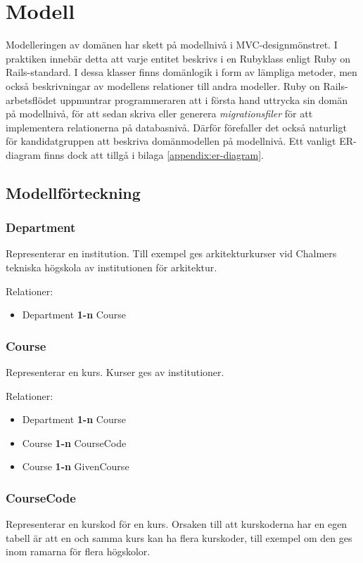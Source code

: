 \section{Modell}

Modelleringen av domänen har skett på modellnivå i MVC-designmönstret. 
I praktiken innebär detta att varje entitet beskrivs i en Rubyklass enligt Ruby on Rails-standard.
I dessa klasser finns domänlogik i form av lämpliga metoder, men också beskrivningar av 
modellens relationer till andra modeller.
Ruby on Rails-arbetsflödet uppmuntrar programmeraren att i första hand uttrycka sin domän på modellnivå,
för att sedan skriva eller generera \emph{migrationsfiler} för att implementera relationerna på databasnivå.
Därför förefaller det också naturligt för kandidatgruppen att beskriva domänmodellen på modellnivå.
Ett vanligt ER-diagram finns dock att tillgå i bilaga \ref{appendix:er-diagram}.

\subsection{Modellförteckning}
\subsubsection{Department}
Representerar en institution. Till exempel ges arkitekturkurser vid Chalmers tekniska högskola av institutionen för arkitektur.

Relationer:
\begin{itemize}
	\item Department {\bf 1-n} Course
\end{itemize}


\subsubsection{Course}
Representerar en kurs. Kurser ges av institutioner.

Relationer:
\begin{itemize}
	\item Department {\bf 1-n} Course
	\item Course {\bf 1-n} CourseCode
	\item Course {\bf 1-n} GivenCourse
\end{itemize}


\subsubsection{CourseCode}
Representerar en kurskod för en kurs. Orsaken till att kurskoderna har en egen tabell är att en och samma kurs kan ha flera kurskoder, till exempel om den ges inom ramarna för flera högskolor.

